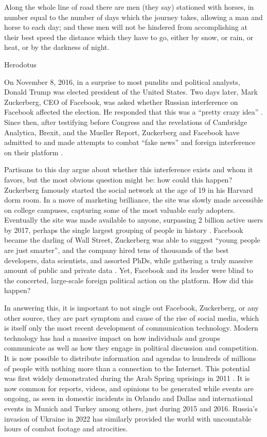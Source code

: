 \documentclass[doublespacing]{utdthesis}
\let\cite=\citep
\begin{document}
\epigraph{Along the whole line of road there are men (they say) stationed with horses, in number equal to the number of days which the journey takes, allowing a man and horse to each day; and these men will not be hindered from accomplishing at their best speed the distance which they have to go, either by snow, or rain, or heat, or by the darkness of night.}{Herodotus}

On November 8, 2016, in a surprise to most pundits and political analysts, Donald Trump was elected president of the United States.
Two days later, Mark Zuckerberg, CEO of Facebook, was asked whether Russian interference on Facebook affected the election.
He responded that this was a ``pretty crazy idea'' \cite{spangler2016}.
Since then, after testifying before Congress and the revelations of Cambridge Analytica, Brexit, and the Mueller Report, Zuckerberg and Facebook have admitted to and made attempts to combat ``fake news'' and foreign interference on their platform \cite{spring2020}.

Partisans to this day argue about whether this interference exists and whom it favors, but the most obvious question might be: how could this happen?
Zuckerberg famously started the social network at the age of 19 in his Harvard dorm room.
In a move of marketing brilliance, the site was slowly made accessible on college campuses, capturing some of the most valuable early adopters.
Eventually the site was made available to anyone, surpassing 2 billion active users by 2017, perhaps the single largest grouping of people in history \cite{yurieff2017}.
Facebook became the darling of Wall Street, Zuckerberg was able to suggest ``young people are just smarter'', and the company hired tens of thousands of the best developers, data scientists, and assorted PhDs, while gathering a truly massive amount of public and private data \cite{coker2007}.
Yet, Facebook and its leader were blind to the concerted, large-scale foreign political action on the platform.
How did this happen?

In answering this, it is important to not single out Facebook, Zuckerberg, or any other source, they are part symptom and cause of the rise of social media, which is itself only the most recent development of communication technology.
Modern technology has had a massive impact on how individuals and groups communicate as well as how they engage in political discussion and competition. It is now possible to distribute information and agendas to hundreds of millions of people with nothing more than a connection to the Internet.
This potential was first widely demonstrated during the Arab Spring uprisings in 2011 \cite[p. 1376]{lotan2011}.
It is now common for reports, videos, and opinions to be generated while events are ongoing, as seen in domestic incidents in Orlando and Dallas and international events in Munich and Turkey among others, just during 2015 and 2016.
Russia's invasion of Ukraine in 2022 has similarly provided the world with uncountable hours of combat footage and atrocities.
\end{document}
